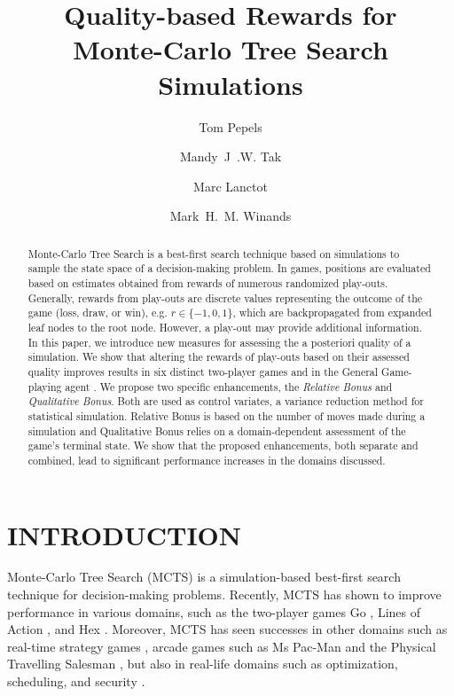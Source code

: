 \documentclass{ecai2014}
\begin{document}
\title{Quality-based Rewards for \\ Monte-Carlo Tree Search Simulations}

\author{Tom Pepels \and Mandy~J~.W. Tak \and Marc Lanctot \and Mark~H.~M. Winands }

\maketitle


\begin{abstract}
Monte-Carlo Tree Search is a best-first search technique based on simulations to sample the state space of a decision-making problem. In games, positions are evaluated based on estimates obtained from rewards of numerous randomized play-outs. Generally, rewards from play-outs are discrete values representing the outcome of the game (loss, draw, or win), e.g. $r \in \{-1, 0, 1\}$, which are backpropagated from expanded leaf nodes to the root node. However, a play-out may provide additional information. In this paper, we introduce new measures for assessing the a posteriori quality of a simulation. We show that altering the rewards of play-outs based on their assessed quality improves results in six distinct two-player games and in the General Game-playing agent {}. We propose two specific enhancements, the \emph{Relative Bonus} and \emph{Qualitative Bonus}. Both are used as control variates, a variance reduction method for statistical simulation. Relative Bonus is based on the number of moves made during a simulation and Qualitative Bonus relies on a domain-dependent assessment of the game's terminal state. We show that the proposed enhancements, both separate and combined, lead to significant performance increases in the domains discussed.
\end{abstract}

\section{INTRODUCTION}
\label{sec:intro}
Monte-Carlo Tree Search (MCTS) \cite{coulom2007efficient,kocsis2006bandit} is a simulation-based best-first search technique for decision-making problems. Recently, MCTS has shown to improve performance in various domains, such as the two-player games Go \cite{lee2010current}, Lines of Action \cite{Winands2010b}, and Hex \cite{arneson2010monte}. Moreover, MCTS has seen successes in other domains such as real-time strategy games \cite{browne2012survey}, arcade games such as Ms Pac-Man \cite{enhancementspacmancig12} and the Physical Travelling Salesman \cite{powleytsp}, but also in real-life domains such as optimization, scheduling, and security \cite{browne2012survey}.
\end{document}
